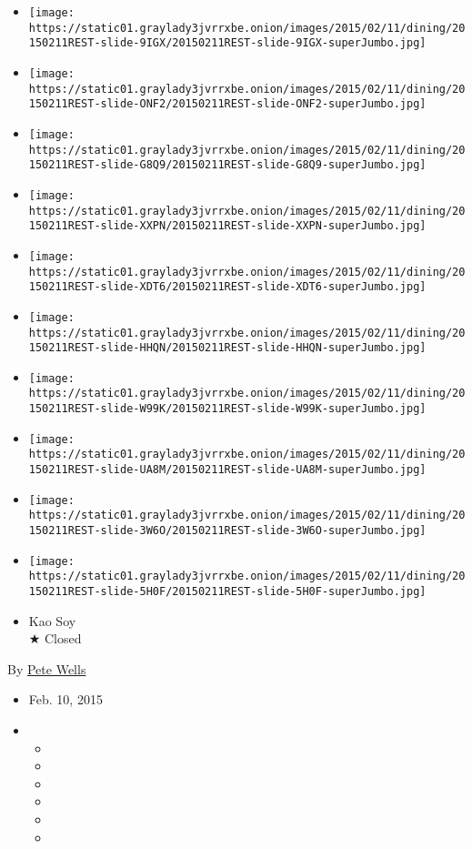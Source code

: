 \begin{itemize}
\item
  \texttt{[image: https://static01.graylady3jvrrxbe.onion/images/2015/02/11/dining/20150211REST-slide-9IGX/20150211REST-slide-9IGX-superJumbo.jpg]}
\item
  \texttt{[image: https://static01.graylady3jvrrxbe.onion/images/2015/02/11/dining/20150211REST-slide-ONF2/20150211REST-slide-ONF2-superJumbo.jpg]}
\item
  \texttt{[image: https://static01.graylady3jvrrxbe.onion/images/2015/02/11/dining/20150211REST-slide-G8Q9/20150211REST-slide-G8Q9-superJumbo.jpg]}
\item
  \texttt{[image: https://static01.graylady3jvrrxbe.onion/images/2015/02/11/dining/20150211REST-slide-XXPN/20150211REST-slide-XXPN-superJumbo.jpg]}
\item
  \texttt{[image: https://static01.graylady3jvrrxbe.onion/images/2015/02/11/dining/20150211REST-slide-XDT6/20150211REST-slide-XDT6-superJumbo.jpg]}
\item
  \texttt{[image: https://static01.graylady3jvrrxbe.onion/images/2015/02/11/dining/20150211REST-slide-HHQN/20150211REST-slide-HHQN-superJumbo.jpg]}
\item
  \texttt{[image: https://static01.graylady3jvrrxbe.onion/images/2015/02/11/dining/20150211REST-slide-W99K/20150211REST-slide-W99K-superJumbo.jpg]}
\item
  \texttt{[image: https://static01.graylady3jvrrxbe.onion/images/2015/02/11/dining/20150211REST-slide-UA8M/20150211REST-slide-UA8M-superJumbo.jpg]}
\item
  \texttt{[image: https://static01.graylady3jvrrxbe.onion/images/2015/02/11/dining/20150211REST-slide-3W6O/20150211REST-slide-3W6O-superJumbo.jpg]}
\item
  \texttt{[image: https://static01.graylady3jvrrxbe.onion/images/2015/02/11/dining/20150211REST-slide-5H0F/20150211REST-slide-5H0F-superJumbo.jpg]}
\end{itemize}

\begin{itemize}
\tightlist
\item
  Kao Soy\\
  ★ Closed
\end{itemize}

By \href{http://www.nytimes3xbfgragh.onion/by/pete-wells}{Pete Wells}

\begin{itemize}
\item
  Feb. 10, 2015
\item
  \begin{itemize}
  \item
  \item
  \item
  \item
  \item
  \item
  \end{itemize}
\end{itemize}

